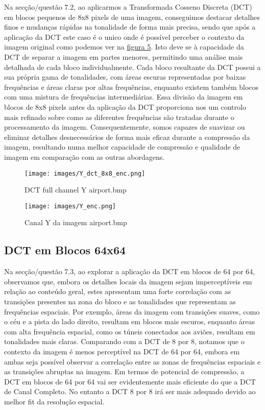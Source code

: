 \documentclass{article}
\begin{document}
Na secção/questão 7.2, ao aplicarmos a Transformada Cosseno Discreta (DCT) em blocos pequenos de 8x8 pixels de uma imagem, conseguimos destacar detalhes finos e mudanças rápidas na tonalidade de forma mais precisa, sendo que após a aplicação da DCT este caso é o unico onde é possível perceber o contexto da imagem original como podemos ver na \hyperref[fig:y_dct_8]{figura 5}. Isto deve se à capacidade da DCT de separar a imagem em partes menores, permitindo uma análise mais detalhada de cada bloco individualmente.
Cada bloco resultante da DCT possui a sua própria gama de tonalidades, com áreas escuras representadas por baixas frequências e áreas claras por altas frequências, enquanto existem também blocos com uma mistura de frequências intermediárias.
Essa divisão da imagem em blocos de 8x8 pixels antes da aplicação da DCT proporciona nos um controlo mais refinado sobre como as diferentes frequências são tratadas durante o processamento da imagem. Consequentemente, somos capazes de suavizar ou eliminar detalhes desnecessários de forma mais eficaz durante a compressão da imagem, resultando numa melhor capacidade de compressão e qualidade de imagem em comparação com as outras abordagens.

\begin{figure} [H]  %
  \centering
  \begin{minipage}[b]{0.49\textwidth}
    \centering
    \texttt{[image: images/Y\_dct\_8x8\_enc.png]}
    \caption{DCT full channel Y airport.bmp}
    \label{fig:y_dct_8}
  \end{minipage}
  \hfill
  \begin{minipage}[b]{0.49\textwidth}
    \centering
    \texttt{[image: images/Y\_enc.png]}
    \caption{Canal Y da imagem airport.bmp}
    \label{fig:y_2}
  \end{minipage}
\end{figure}

\subsection{DCT em Blocos 64x64}

Na secção/questão 7.3, ao explorar a aplicação da DCT em blocos de 64 por 64, observamos que, embora os detalhes locais da imagem sejam imperceptíveis em relação ao conteúdo geral, estes apresentam uma forte correlação com as transições presentes na zona do bloco e as tonalidades que representam as frequências espaciais. Por exemplo, áreas da imagem com transições suaves, como o céu e a pista do lado direito, resultam em blocos mais escuros, enquanto áreas com alta frequência espacial, como os túneis conectados aos aviões, resultam em tonalidades mais claras. Comparando com a DCT de 8 por 8, notamos que o contexto da imagem é menos perceptível na DCT de 64 por 64, embora em ambas seja possível observar a correlação entre as zonas de frequências espaciais e as transições abruptas na imagem. Em termos de potencial de compressão, a DCT em blocos de 64 por 64 vai ser evidentemente mais eficiente do que a DCT de Canal Completo. No entanto a DCT 8 por 8 irá ser mais adequado devido ao melhor fit da resolução espacial.
\end{document}
